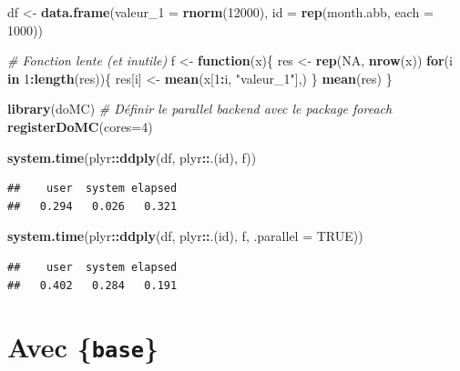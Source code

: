 \documentclass[
  11pt,
]{book}
\newenvironment{Shaded}{\begin{snugshade}}{\end{snugshade}}
\newcommand{\CommentTok}[1]{\textcolor[rgb]{0.56,0.35,0.01}{\textit{#1}}}
\newcommand{\ControlFlowTok}[1]{\textcolor[rgb]{0.13,0.29,0.53}{\textbf{#1}}}
\newcommand{\DataTypeTok}[1]{\textcolor[rgb]{0.13,0.29,0.53}{#1}}
\newcommand{\DecValTok}[1]{\textcolor[rgb]{0.00,0.00,0.81}{#1}}
\newcommand{\KeywordTok}[1]{\textcolor[rgb]{0.13,0.29,0.53}{\textbf{#1}}}
\newcommand{\NormalTok}[1]{#1}
\newcommand{\OperatorTok}[1]{\textcolor[rgb]{0.81,0.36,0.00}{\textbf{#1}}}
\newcommand{\OtherTok}[1]{\textcolor[rgb]{0.56,0.35,0.01}{#1}}
\newcommand{\StringTok}[1]{\textcolor[rgb]{0.31,0.60,0.02}{#1}}
\numberwithin{equation}{section}
\numberwithin{countremarque}{section}
\begin{document}
\begin{Shaded}
\begin{Highlighting}[]
\NormalTok{df \textless{}{-}}\StringTok{ }
\StringTok{  }\KeywordTok{data.frame}\NormalTok{(}\DataTypeTok{valeur\_1 =} \KeywordTok{rnorm}\NormalTok{(}\DecValTok{12000}\NormalTok{),}
         \DataTypeTok{id =} \KeywordTok{rep}\NormalTok{(month.abb, }\DataTypeTok{each =} \DecValTok{1000}\NormalTok{))}

\CommentTok{\# Fonction lente (et inutile)}
\NormalTok{f \textless{}{-}}\StringTok{ }\ControlFlowTok{function}\NormalTok{(x)\{}
\NormalTok{  res \textless{}{-}}\StringTok{ }\KeywordTok{rep}\NormalTok{(}\OtherTok{NA}\NormalTok{, }\KeywordTok{nrow}\NormalTok{(x))}
  \ControlFlowTok{for}\NormalTok{(i }\ControlFlowTok{in} \DecValTok{1}\OperatorTok{:}\KeywordTok{length}\NormalTok{(res))\{}
\NormalTok{    res[i] \textless{}{-}}\StringTok{ }\KeywordTok{mean}\NormalTok{(x[}\DecValTok{1}\OperatorTok{:}\NormalTok{i, }\StringTok{"valeur\_1"}\NormalTok{],)}
\NormalTok{  \}}
  \KeywordTok{mean}\NormalTok{(res)}
\NormalTok{\}}

\KeywordTok{library}\NormalTok{(doMC)}
\CommentTok{\# Définir le parallel backend avec le package foreach}
\KeywordTok{registerDoMC}\NormalTok{(}\DataTypeTok{cores=}\DecValTok{4}\NormalTok{)}

\KeywordTok{system.time}\NormalTok{(plyr}\OperatorTok{::}\KeywordTok{ddply}\NormalTok{(df, plyr}\OperatorTok{::}\NormalTok{.(id), f))}
\end{Highlighting}
\end{Shaded}

\begin{lstlisting}
##    user  system elapsed 
##   0.294   0.026   0.321
\end{lstlisting}

\begin{Shaded}
\begin{Highlighting}[]
\KeywordTok{system.time}\NormalTok{(plyr}\OperatorTok{::}\KeywordTok{ddply}\NormalTok{(df, plyr}\OperatorTok{::}\NormalTok{.(id), f, }\DataTypeTok{.parallel =} \OtherTok{TRUE}\NormalTok{))}
\end{Highlighting}
\end{Shaded}

\begin{lstlisting}
##    user  system elapsed 
##   0.402   0.284   0.191
\end{lstlisting}

\hypertarget{boucles_vectorisation_apply}{%
\section{\texorpdfstring{Avec \{\texttt{base}\}}{Avec \{base\}}}\label{boucles_vectorisation_apply}}
\end{document}
